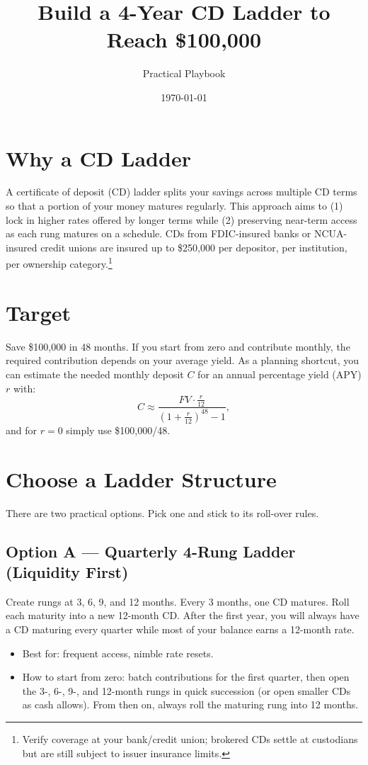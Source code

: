 \documentclass[11pt]{article}
\title{Build a 4-Year CD Ladder to Reach \$100{,}000}
\author{Practical Playbook}
\date{\today}
\begin{document}
\maketitle

\section*{Why a CD Ladder}
A certificate of deposit (CD) ladder splits your savings across multiple CD terms so that a portion of your money matures regularly. This approach aims to (1) lock in higher rates offered by longer terms while (2) preserving near-term access as each rung matures on a schedule. CDs from FDIC-insured banks or NCUA-insured credit unions are insured up to \$250{,}000 per depositor, per institution, per ownership category.\footnote{Verify coverage at your bank/credit union; brokered CDs settle at custodians but are still subject to issuer insurance limits.}

\section*{Target}
Save \$100{,}000 in 48 months. If you start from zero and contribute monthly, the required contribution depends on your average yield. As a planning shortcut, you can estimate the needed monthly deposit $C$ for an annual percentage yield (APY) $r$ with:
\begin{equation*}
C \approx \frac{FV \cdot \frac{r}{12}}{(1+\frac{r}{12})^{48}-1},
\end{equation*}
and for $r=0$ simply use \$100{,}000/48.

\section*{Choose a Ladder Structure}
There are two practical options. Pick one and stick to its roll-over rules.
\subsection*{Option A --- Quarterly 4-Rung Ladder (Liquidity First)}
Create rungs at 3, 6, 9, and 12 months. Every 3 months, one CD matures. Roll each maturity into a new 12-month CD. After the first year, you will always have a CD maturing every quarter while most of your balance earns a 12-month rate.
\begin{itemize}
  \item Best for: frequent access, nimble rate resets.
  \item How to start from zero: batch contributions for the first quarter, then open the 3-, 6-, 9-, and 12-month rungs in quick succession (or open smaller CDs as cash allows). From then on, always roll the maturing rung into 12 months.
\end{itemize}
\end{document}
